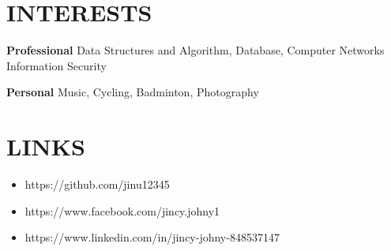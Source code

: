 \documentclass[]{cv-style}          %
\begin{document}
\section{INTERESTS}
\vspace{-0.3cm}
  {}

\begin{entrylist}
\entry
 {\textbf{Professional}}
{}
  {}
  {Data Structures and Algorithm, Database, Computer Networks\\ Information Security }
\end{entrylist}
%
\begin{entrylist}
\entry
 {\textbf{Personal}}
{}
  {}
  {Music, Cycling, Badminton, Photography }

\end{entrylist}
%
\section{LINKS}
\begin{itemize}
\item https://github.com/jinu12345
\item https://www.facebook.com/jincy.johny1
\item https://www.linkedin.com/in/jincy-johny-848537147
\end{itemize}




%










\end{document}
